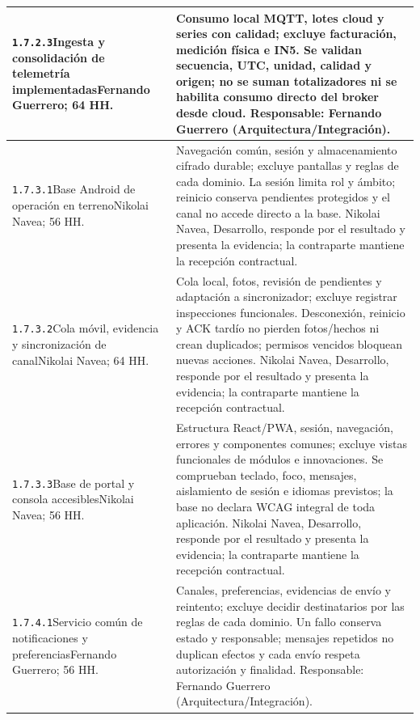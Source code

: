 \begin{longtable}{L{52mm}L{91mm}}
\texttt{1.\allowbreak{}7.\allowbreak{}2.\allowbreak{}3}\newline Ingesta y consolidación de telemetría implementadas\newline Fernando Guerrero; 64 HH. & Consumo local MQTT, lotes cloud y series con calidad; excluye facturación, medición física e IN5. Se validan secuencia, UTC, unidad, calidad y origen; no se suman totalizadores ni se habilita consumo directo del broker desde cloud. Responsable: Fernando Guerrero (Arquitectura/Integración).\\\hline
\texttt{1.\allowbreak{}7.\allowbreak{}3.\allowbreak{}1}\newline Base Android de operación en terreno\newline Nikolai Navea; 56 HH. & Navegación común, sesión y almacenamiento cifrado durable; excluye pantallas y reglas de cada dominio. La sesión limita rol y ámbito; reinicio conserva pendientes protegidos y el canal no accede directo a la base. Nikolai Navea, Desarrollo, responde por el resultado y presenta la evidencia; la contraparte mantiene la recepción contractual.\\\hline
\texttt{1.\allowbreak{}7.\allowbreak{}3.\allowbreak{}2}\newline Cola móvil, evidencia y sincronización de canal\newline Nikolai Navea; 64 HH. & Cola local, fotos, revisión de pendientes y adaptación a sincronizador; excluye registrar inspecciones funcionales. Desconexión, reinicio y ACK tardío no pierden fotos/hechos ni crean duplicados; permisos vencidos bloquean nuevas acciones. Nikolai Navea, Desarrollo, responde por el resultado y presenta la evidencia; la contraparte mantiene la recepción contractual.\\\hline
\texttt{1.\allowbreak{}7.\allowbreak{}3.\allowbreak{}3}\newline Base de portal y consola accesibles\newline Nikolai Navea; 56 HH. & Estructura React/PWA, sesión, navegación, errores y componentes comunes; excluye vistas funcionales de módulos e innovaciones. Se comprueban teclado, foco, mensajes, aislamiento de sesión e idiomas previstos; la base no declara WCAG integral de toda aplicación. Nikolai Navea, Desarrollo, responde por el resultado y presenta la evidencia; la contraparte mantiene la recepción contractual.\\\hline
\texttt{1.\allowbreak{}7.\allowbreak{}4.\allowbreak{}1}\newline Servicio común de notificaciones y preferencias\newline Fernando Guerrero; 56 HH. & Canales, preferencias, evidencias de envío y reintento; excluye decidir destinatarios por las reglas de cada dominio. Un fallo conserva estado y responsable; mensajes repetidos no duplican efectos y cada envío respeta autorización y finalidad. Responsable: Fernando Guerrero (Arquitectura/Integración).\\\hline

\end{longtable}
